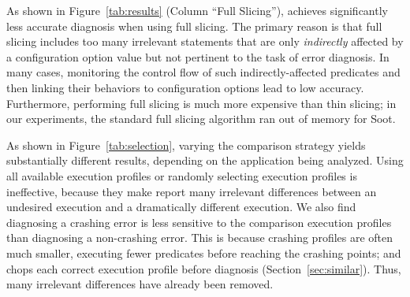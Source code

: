 As shown in Figure~\ref{tab:results}  (Column ``Full Slicing''),
\ourtool achieves significantly less accurate diagnosis when using
full slicing. The primary reason is that full slicing includes
too many irrelevant statements that are only \textit{indirectly} affected by
a configuration option value but not pertinent to the task of
error diagnosis. In many cases, monitoring the control flow
of such indirectly-affected predicates and then linking their
behaviors to configuration options lead to low accuracy. Furthermore,
performing full slicing is much more expensive than thin slicing; in
our experiments, the standard full slicing algorithm ran out of
memory for Soot.



As shown in Figure~\ref{tab:selection}, varying the comparison
strategy yields substantially different results,
depending on the application being analyzed.
Using all available execution profiles or randomly
selecting execution profiles is ineffective, because
they make \ourtool report many irrelevant
differences between an undesired
execution and a dramatically different execution.
We also find diagnosing a crashing error is less sensitive 
to the comparison execution profiles than diagnosing a non-crashing error.
This is because crashing profiles are often much smaller, executing
fewer predicates before reaching the crashing points; and \ourtool
chops each correct execution profile before diagnosis (Section~\ref{sec:similar}).
Thus, many irrelevant differences have already been removed.





